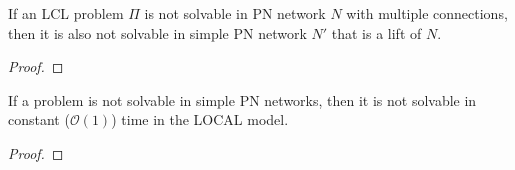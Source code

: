 %
\begin{theorem} \label{thm:lcl_nonsolvability:4}
    If an LCL problem $\Pi$ is not solvable in PN network $N$ with multiple connections, then it is also not solvable in simple PN network $N'$ that is a lift of $N$.
\end{theorem}
\begin{proof}
\end{proof}



\begin{theorem}
    If a problem is not solvable in simple PN networks, then it is not solvable in constant ($\mathcal{O}(1)$) time in the LOCAL model.
\end{theorem}
\begin{proof}
\end{proof}